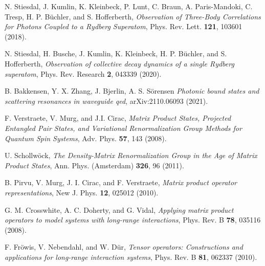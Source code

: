 \documentclass[pra,twocolumn,showpacs,preprintnumbers,amsmath,amssymb]{revtex4-1}
\begin{document}
\begin{thebibliography}{99}
 N. Stiesdal, J. Kumlin, K. Kleinbeck, P. Lunt, C. Braun, A. Paris-Mandoki, C. Tresp, H. P. B\"uchler, and S. Hofferberth, \textit{Observation of Three-Body Correlations for Photons Coupled to a Rydberg Superatom},  Phys. Rev. Lett.  {\bf 121}, 103601 (2018).

 N. Stiesdal, H. Busche, J. Kumlin, K. Kleinbeck, H. P. B\"uchler, and S. Hofferberth, \textit{Observation of collective decay dynamics of a single Rydberg superatom},  Phys. Rev. Research  {\bf 2},  043339 (2020).



 B. Bakkensen, Y. X. Zhang, J. Bjerlin, A. S. S\"orensen \textit{Photonic bound states and scattering resonances in waveguide qed}, 
arXiv:2110.06093 (2021).


 F. Verstraete, V. Murg, and J.I. Cirac,   \textit{Matrix Product States, Projected Entangled Pair States, and Variational Renormalization Group Methods for Quantum Spin Systems}, Adv. Phys. {\bf 57}, 143 (2008).

 U. Schollw\"ock,   \textit{The Density-Matrix Renormalization Group in the Age of Matrix Product States}, Ann. Phys. (Amsterdam) {\bf 326}, 96 (2011).



 B. Pirvu, V. Murg, J. I. Cirac, and F. Verstraete, \textit{Matrix product operator representations}, New
J. Phys. {\bf 12}, 025012 (2010).


 G. M. Crosswhite, A. C. Doherty, and G. Vidal,  \textit{Applying matrix product operators to model systems with long-range interactions}, Phys. Rev. B {\bf 78}, 035116 (2008).

 F. Fr\"owis, V. Nebendahl, and W. D\"ur, \textit{Tensor operators: Constructions and applications for long-range interaction systems}, Phys.
Rev. B {\bf 81}, 062337 (2010).






\end{thebibliography}
\end{document}
